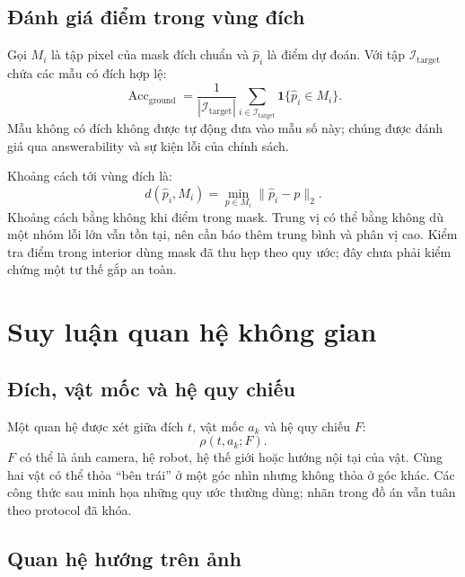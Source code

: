 \subsection{Đánh giá điểm trong vùng đích}

Gọi $M_i$ là tập pixel của mask đích chuẩn và $\widehat{p}_i$ là điểm dự đoán. Với tập $\mathcal{I}_{\mathrm{target}}$ chứa các mẫu có đích hợp lệ:
\begin{equation}
    \operatorname{Acc}_{\mathrm{ground}}=
    \frac{1}{|\mathcal{I}_{\mathrm{target}}|}
    \sum_{i\in\mathcal{I}_{\mathrm{target}}}
    \mathbf{1}\{\widehat{p}_i\in M_i\}.
    \label{eq:theory-point-hit}
\end{equation}
Mẫu không có đích không được tự động đưa vào mẫu số này; chúng được đánh giá qua answerability và sự kiện lỗi của chính sách.

Khoảng cách tới vùng đích là:
\begin{equation}
    d(\widehat{p}_i,M_i)=\min_{p\in M_i}\|\widehat{p}_i-p\|_2.
    \label{eq:theory-target-distance}
\end{equation}
Khoảng cách bằng không khi điểm trong mask. Trung vị có thể bằng không dù một nhóm lỗi lớn vẫn tồn tại, nên cần báo thêm trung bình và phân vị cao. Kiểm tra điểm trong interior dùng mask đã thu hẹp theo quy ước; đây chưa phải kiểm chứng một tư thế gắp an toàn.

\section{Suy luận quan hệ không gian}
\label{sec:theory-spatial-relations}

\subsection{Đích, vật mốc và hệ quy chiếu}

Một quan hệ được xét giữa đích $t$, vật mốc $a_k$ và hệ quy chiếu $F$:
\begin{equation}
    \rho(t,a_k;F).
    \label{eq:theory-relation}
\end{equation}
$F$ có thể là ảnh camera, hệ robot, hệ thế giới hoặc hướng nội tại của vật. Cùng hai vật có thể thỏa “bên trái” ở một góc nhìn nhưng không thỏa ở góc khác. Các công thức sau minh họa những quy ước thường dùng; nhãn trong đồ án vẫn tuân theo protocol đã khóa.

\subsection{Quan hệ hướng trên ảnh}

